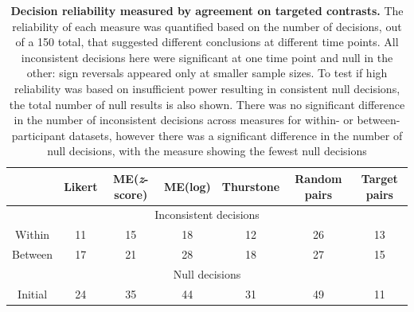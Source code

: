 \documentclass[doc]{apa6}
\newcommand{\targchoice}{{\sc Target pairs}}
\newcommand{\rndchoice}{{\sc Random pairs}}
\newcommand{\MElog}{{\sc ME{(log)}}}
\newcommand{\MEz}{{\sc ME{({\it z}-score)}}}
\newcommand{\thurstone}{{\sc Thurstone}}
\newcommand{\likert}{{\sc Likert}}
\begin{document}
\begin{table}[t]
\begin{adjustwidth}{-1.5cm}{}
\begin{small}
\centering
\vspace{3mm}

\begin{tabular}{|c|cccccc|}
\hline
& \likert{} & \MEz{} & \MElog{} & \thurstone{} & \rndchoice{} & \targchoice{} \\
\hline
\multicolumn{7}{|c|}{Inconsistent decisions} \\
\hline
Within & 11 & 15 & 18 & 12 & 26 & 13 \\
Between & 17 & 21 & 28 & 18 & 27 & 15 \\
\hline
\multicolumn{7}{|c|}{Null decisions} \\
\hline
Initial & 24 & 35 & 44 & 31 & 49 & 11 \\
\hline
\end{tabular}
\caption{ {\bf Decision reliability measured by agreement on targeted contrasts.} The reliability of each measure was quantified based on the number of decisions, out of a 150 total, that suggested different conclusions at different time points. All inconsistent decisions here were significant at one time point and null in the other: sign reversals appeared only at smaller sample sizes. To test if high reliability was based on insufficient power resulting in consistent null decisions, the total number of null results is also shown. There was no significant difference in the number of inconsistent decisions across measures for within- or between- participant datasets, however there was a significant difference in the number of null decisions, with the \protect{\targchoice{}} measure showing the fewest null decisions
\label{tab:inconsistent}}
\end{small}
\end{adjustwidth}
\end{table}
\end{document}
